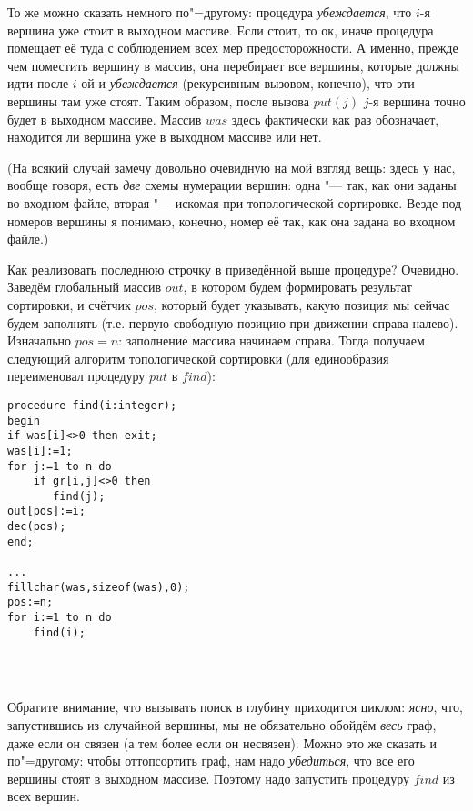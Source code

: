 То же можно сказать немного по"=другому: процедура \textit{убеждается}, что $i$-я  вершина уже 
стоит в выходном массиве. Если стоит, то ок, иначе процедура помещает её туда с соблюдением всех мер 
предосторожности. А именно, прежде чем поместить вершину в массив, она перебирает все вершины, 
которые должны идти после $i$-ой и \textit{убеждается} (рекурсивным вызовом, конечно), что эти 
вершины там уже стоят. Таким образом, после вызова $put(j)$ $j$-я вершина точно будет в выходном 
массиве. Массив $was$ здесь фактически как раз обозначает, находится ли вершина уже в 
выходном массиве или нет.

(На всякий случай замечу довольно очевидную на мой взгляд вещь: здесь у нас, вообще говоря, есть 
\textit{две} схемы нумерации вершин: одна "--- так, как они заданы во входном файле, вторая "--- 
искомая при топологической сортировке. Везде под номеров вершины я понимаю, конечно, номер её так, 
как она задана во входном файле.)

Как реализовать последнюю строчку в приведённой выше процедуре? Очевидно. Заведём глобальный массив 
$out$, в котором будем формировать результат сортировки, и счётчик $pos$, который будет указывать, 
какую позиция мы сейчас будем заполнять (т.е. первую свободную позицию при движении справа налево). 
Изначально $pos=n$: заполнение массива начинаем 
справа. Тогда получаем следующий алгоритм топологической сортировки (для единообразия переименовал 
процедуру $put$ в $find$):
\begin{codesample}\begin{verbatim}
procedure find(i:integer);
begin
if was[i]<>0 then exit;
was[i]:=1;
for j:=1 to n do
    if gr[i,j]<>0 then
       find(j);
out[pos]:=i;
dec(pos);
end;

...
fillchar(was,sizeof(was),0);
pos:=n;
for i:=1 to n do
    find(i);
    
   
       
\end{verbatim}
\end{codesample}

Обратите внимание, что вызывать поиск в глубину приходится циклом: \textit{ясно}, что, запустившись из 
случайной вершины, мы не обязательно обойдём \textit{весь} граф, даже если он связен (а тем более 
если он несвязен). Можно это же сказать и по"=другому: чтобы оттопсортить граф, нам надо 
\textit{убедиться}, что все его вершины стоят в выходном массиве. Поэтому надо запустить процедуру 
$find$ из всех вершин.


